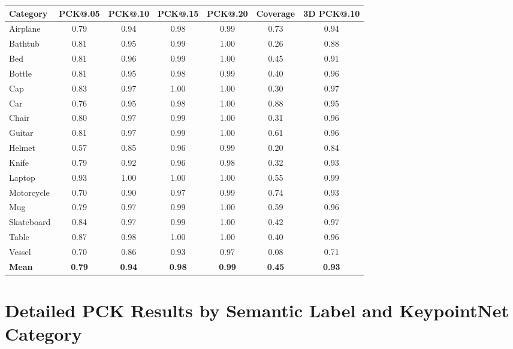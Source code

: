 \begin{table}[t]
    \begin{tabular}{lccccc|c}
        \toprule
        \textbf{Category} &
        \textbf{PCK@.05} &
        \textbf{PCK@.10} &
        \textbf{PCK@.15} &
        \textbf{PCK@.20} &
        \textbf{Coverage} &
        \textbf{3D PCK@.10} \\
        \midrule
        Airplane   & 0.79 & 0.94 & 0.98 & 0.99 & 0.73 & 0.94 \\
        Bathtub    & 0.81 & 0.95 & 0.99 & 1.00 & 0.26 & 0.88 \\
        Bed        & 0.81 & 0.96 & 0.99 & 1.00 & 0.45 & 0.91 \\
        Bottle     & 0.81 & 0.95 & 0.98 & 0.99 & 0.40 & 0.96 \\
        Cap        & 0.83 & 0.97 & 1.00 & 1.00 & 0.30 & 0.97 \\
        Car        & 0.76 & 0.95 & 0.98 & 1.00 & 0.88 & 0.95 \\
        Chair      & 0.80 & 0.97 & 0.99 & 1.00 & 0.31 & 0.96 \\
        Guitar     & 0.81 & 0.97 & 0.99 & 1.00 & 0.61 & 0.96 \\
        Helmet     & 0.57 & 0.85 & 0.96 & 0.99 & 0.20 & 0.84 \\
        Knife      & 0.79 & 0.92 & 0.96 & 0.98 & 0.32 & 0.93 \\
        Laptop     & 0.93 & 1.00 & 1.00 & 1.00 & 0.55 & 0.99 \\
        Motorcycle & 0.70 & 0.90 & 0.97 & 0.99 & 0.74 & 0.93 \\
        Mug        & 0.79 & 0.97 & 0.99 & 1.00 & 0.59 & 0.96 \\
        Skateboard & 0.84 & 0.97 & 0.99 & 1.00 & 0.42 & 0.97 \\
        Table      & 0.87 & 0.98 & 1.00 & 1.00 & 0.40 & 0.96 \\
        Vessel     & 0.70 & 0.86 & 0.93 & 0.97 & 0.08 & 0.71 \\
        \midrule
        \textbf{Mean}
        & \textbf{0.79} & \textbf{0.94}
        & \textbf{0.98} & \textbf{0.99}
        & \textbf{0.45} & \textbf{0.93} \\
        \bottomrule
    \end{tabular}
\end{table}




\section{Detailed PCK Results by Semantic Label and KeypointNet Category}
\label{Sup:per_label}

